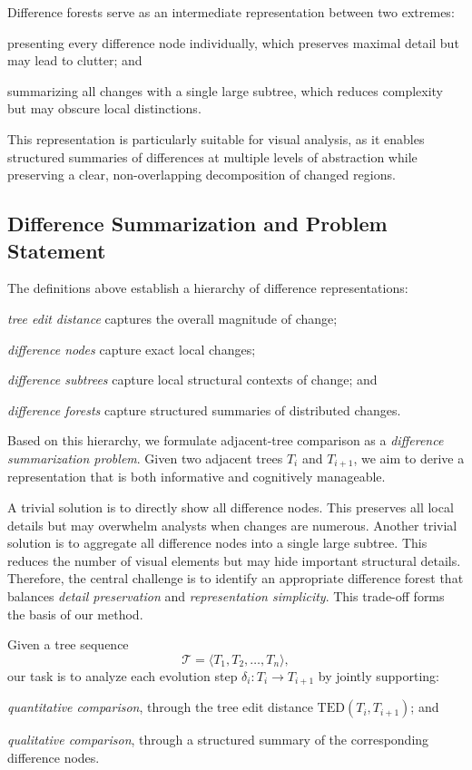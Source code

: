 Difference forests serve as an intermediate representation between two extremes:
\squishlist
\item presenting every difference node individually, which preserves maximal detail but may lead to clutter; and
\item summarizing all changes with a single large subtree, which reduces complexity but may obscure local distinctions.
\squishend

This representation is particularly suitable for visual analysis, as it enables structured summaries of differences at multiple levels of abstraction while preserving a clear, non-overlapping decomposition of changed regions.

\subsection{Difference Summarization and Problem Statement}

The definitions above establish a hierarchy of difference representations:
\squishlist
\item \emph{tree edit distance} captures the overall magnitude of change;
\item \emph{difference nodes} capture exact local changes;
\item \emph{difference subtrees} capture local structural contexts of change; and
\item \emph{difference forests} capture structured summaries of distributed changes.
\squishend

Based on this hierarchy, we formulate adjacent-tree comparison as a \emph{difference summarization problem}. Given two adjacent trees $T_i$ and $T_{i+1}$, we aim to derive a representation that is both informative and cognitively manageable.

A trivial solution is to directly show all difference nodes. This preserves all local details but may overwhelm analysts when changes are numerous. Another trivial solution is to aggregate all difference nodes into a single large subtree. This reduces the number of visual elements but may hide important structural details. Therefore, the central challenge is to identify an appropriate difference forest that balances \emph{detail preservation} and \emph{representation simplicity}. This trade-off forms the basis of our method.

Given a tree sequence
\[
\mathcal{T} = \langle T_1, T_2, \dots, T_n \rangle,
\]
our task is to analyze each evolution step $\delta_i : T_i \rightarrow T_{i+1}$ by jointly supporting:
\squishlist
\item \emph{quantitative comparison}, through the tree edit distance $\mathrm{TED}(T_i, T_{i+1})$; and
\item \emph{qualitative comparison}, through a structured summary of the corresponding difference nodes.
\squishend

